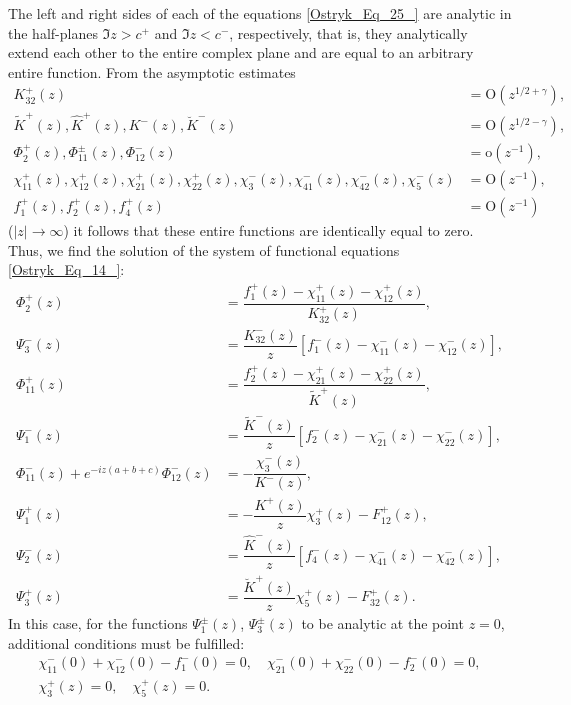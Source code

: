 The left and right sides of each of the equations \eqref{Ostryk_Eq_25_} are analytic in the half-planes $\Im z>c^{+} $ and $\Im z<c^{-} $, respectively, that is, they analytically extend each other to the entire complex plane and are equal to an arbitrary entire function. From the asymptotic estimates
\begin{equation} \label{Ostryk_Eq_26_} 
\begin{aligned}
	K_{32}^{+} (z)&=\mathrm{O}(z^{1/2 +\gamma } ),
	\\ \tilde{K}^{+} (z), \hat{K}^{+} (z), K^{-} (z), \breve{K}^{-} (z)&=\mathrm{O}(z^{1/2 -\gamma } ),
	\\
	\Phi _{2}^{+} (z), \Phi _{11}^{\pm } (z), \Phi _{12}^{-} (z)&=\mathrm{o}(z^{-1} ),
	\\
	\chi _{11}^{+} (z), \chi _{12}^{+} (z), \chi _{21}^{+} (z), \chi _{22}^{+} (z), \chi _{3}^{-} (z), \chi _{41}^{-} (z), \chi _{42}^{-} (z), \chi _{5}^{-} (z)&=\mathrm{O}(z^{-1} ),
	\\
	f_{1}^{+} (z), f_{2}^{+} (z), f_{4}^{+} (z)&=\mathrm{O}(z^{-1} )\quad    
\end{aligned}\end{equation} 
($|z|\to \infty$) it follows that these entire functions are identically equal to zero. Thus, we find the solution of the system of functional equations \eqref{Ostryk_Eq_14_}:
\begin{equation} \label{Ostryk_Eq_27_} 
\begin{aligned}
	\Phi _{2}^{+} (z)&=\dfrac{f_{1}^{+} (z)-\chi _{11}^{+} (z)-\chi _{12}^{+} (z)}{K_{32}^{+} (z)} ,   
	\\
	\Psi _{3}^{-} (z)&=\dfrac{K_{32}^{-} (z)}{z} \left[f_{1}^{-} (z)-\chi _{11}^{-} (z)-\chi _{12}^{-} (z)\right],
	\\
	\Phi _{11}^{+} (z)&=\dfrac{f_{2}^{+} (z)-\chi _{21}^{+} (z)-\chi _{22}^{+} (z)}{\tilde{K}^{+} (z)} ,  
	\\
	\Psi _{1}^{-} (z)&=\dfrac{\tilde{K}^{-} (z)}{z} \left[f_{2}^{-} (z)-\chi _{21}^{-} (z)-\chi _{22}^{-} (z)\right],
	\\
	\Phi _{11}^{-} (z)+e^{-iz(a+b+c)} \Phi _{12}^{-} (z)&=-\dfrac{\chi _{3}^{-} (z)}{K^{-} (z)} , 
	\\
	\Psi _{1}^{+} (z)&=-\dfrac{K^{+} (z)}{z} \chi _{3}^{+} (z)-F_{12}^{+} (z),
	\\
	\Psi _{2}^{-} (z)&=\dfrac{\hat{K}^{-} (z)}{z} \left[f_{4}^{-} (z)-\chi _{41}^{-} (z)-\chi _{42}^{-} (z)\right],
	\\
	\Psi _{3}^{+} (z)&=\dfrac{\breve{K}^{+} (z)}{z} \chi _{5}^{+} (z)-F_{32}^{+} (z).  
\end{aligned}
\end{equation} 
%
In this case, for the functions $\Psi _{1}^{\pm } (z)$, $\Psi _{3}^{\pm } (z)$ to be analytic at the point $z=0$, additional conditions must be fulfilled:
\begin{equation} \label{Ostryk_Eq_28_}
	\begin{aligned}
	\chi _{11}^{-} (0)+\chi _{12}^{-} (0)-f_{1}^{-} (0)=0,   \quad  \chi _{21}^{-} (0)+\chi _{22}^{-} (0)-f_{2}^{-} (0)=0,
 \\
\chi _{3}^{+} (z)=0,\quad    \chi _{5}^{+} (z)=0.  
\end{aligned}
\end{equation} 

